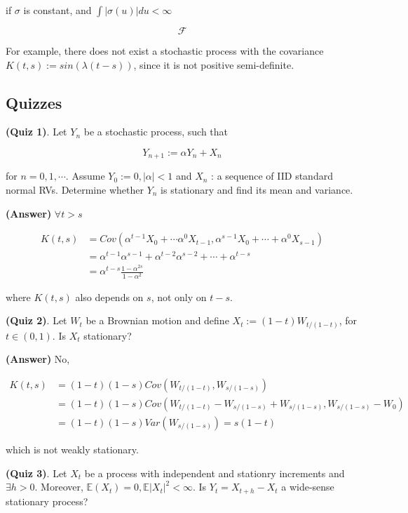 \documentclass[12pt]{article}
\theoremstyle{nonumberbreak}
\begin{document}
if $\sigma$ is constant, and $\int |\sigma (u)| du < \infty $ 

$$
\mathcal{F}
$$


For example, there does not exist a stochastic process with the covariance $K(t,s) := sin( \lambda (t-s) )$, since it is not positive semi-definite.


\subsection*{Quizzes}

\textbf{(Quiz 1)}. Let $Y_n$ be a stochastic process, such that

$$
Y_{n+1} := \alpha Y_n + X_n
$$

for $n=0, 1, \cdots$. Assume $Y_0 := 0, |\alpha| < 1$ and $X_n$ : a sequence of IID standard normal RVs. Determine whether $Y_n$ is stationary and find its mean and variance.


\textbf{(Answer)} $\forall t > s$

$$
\begin{aligned}
K(t,s) &= Cov(\alpha^{t-1} X_0 + \cdots \alpha^0 X_{t-1}, \alpha^{s-1} X_0 + \cdots + \alpha^0 X_{s-1}) \\[8pt]
&= \alpha^{t-1} \alpha^{s-1} + \alpha^{t-2} \alpha^{s-2} + \cdots + \alpha^{t-s} \\[8pt]
&= \alpha^{t-s} \frac{1-\alpha^{2s}}{1-\alpha^2}
\end{aligned}
$$

where $K(t,s)$ also depends on $s$, not only on $t-s$.




\textbf{(Quiz 2)}. Let $W_t$ be a Brownian motion and define $X_t := (1-t) W_{t/(1-t)}$, for $t \in (0,1)$. Is $X_t$ stationary? 

\textbf{(Answer)} No,

$$
\begin{aligned}
K(t,s) &= (1-t)(1-s) Cov(W_{t/(1-t)}, W_{s/(1-s)}) \\[8pt]
&= (1-t)(1-s) Cov(W_{t/(1-t)} - W_{s/(1-s)} + W_{s/(1-s)}, W_{s/(1-s)} - W_0) \\[8pt]
&= (1-t)(1-s) Var(W_{s/(1-s)}) = s(1-t)
\end{aligned}
$$

which is not weakly stationary. 


\textbf{(Quiz 3)}. Let $X_t$ be a process with independent and stationry increments and $\exists h>0$. Moreover, $\mathbb{E}(X_t) = 0, \mathbb{E}|X_t|^2 < \infty$. Is $Y_t = X_{t+h} - X_t$ a wide-sense stationary process? 
\end{document}
